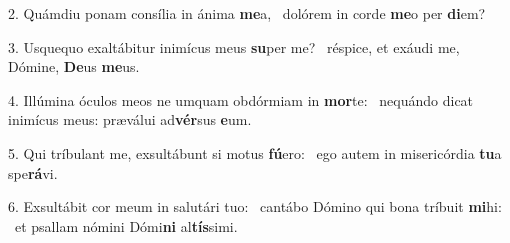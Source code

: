 2. Quámdiu ponam consília in ánima \textbf{me}a, \ast\  dolórem in corde \textbf{me}o per \textbf{di}em?\

3. Usquequo exaltábitur inimícus meus \textbf{su}per me? \ast\  réspice, et exáudi me, Dómine, \textbf{De}us \textbf{me}us.\

4. Illúmina óculos meos ne umquam obdórmiam in \textbf{mor}te: \ast\  nequándo dicat inimícus meus: præválui ad\textbf{vér}sus \textbf{e}um.\

5. Qui tríbulant me, exsultábunt si motus \textbf{fú}ero: \ast\  ego autem in misericórdia \textbf{tu}a spe\textbf{rá}vi.\

6. Exsultábit cor meum in salutári tuo: \dag\  cantábo Dómino qui bona tríbuit \textbf{mi}hi: \ast\  et psallam nómini Dómi\textbf{ni} al\textbf{tís}simi.\

